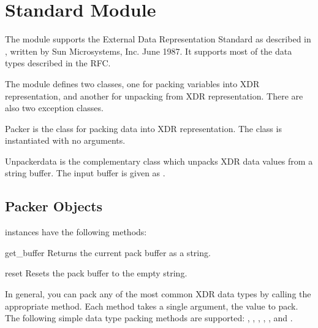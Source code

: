 \section{Standard Module }
\label{module-xdrlib}



The  module supports the External Data Representation
Standard as described in , written by Sun Microsystems,
Inc. June 1987.  It supports most of the data types described in the
RFC.

The  module defines two classes, one for packing
variables into XDR representation, and another for unpacking from XDR
representation.  There are also two exception classes.

\begin{classdesc}{Packer}{}
 is the class for packing data into XDR representation.
The  class is instantiated with no arguments.
\end{classdesc}

\begin{classdesc}{Unpacker}{data}
 is the complementary class which unpacks XDR data
values from a string buffer.  The input buffer is given as
.
\end{classdesc}


\subsection{Packer Objects}
\label{xdr-packer-objects}

 instances have the following methods:

\begin{methoddesc}[Packer]{get_buffer}{}
Returns the current pack buffer as a string.
\end{methoddesc}

\begin{methoddesc}[Packer]{reset}{}
Resets the pack buffer to the empty string.
\end{methoddesc}

In general, you can pack any of the most common XDR data types by
calling the appropriate  method.  Each method
takes a single argument, the value to pack.  The following simple data
type packing methods are supported: ,
, , ,
, and .

